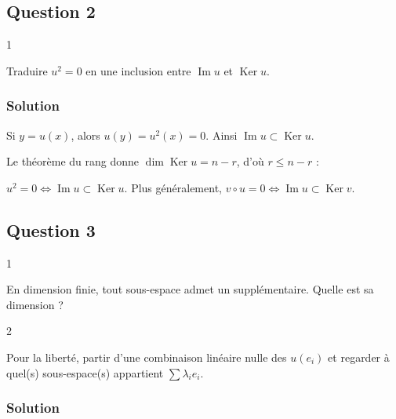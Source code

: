 \documentclass[11pt,a4paper]{article}
\newcommand{\equationajustee}[1]{%
  \sbox{\boiteequation}{$\displaystyle #1$}%
  \ifdim\wd\boiteequation>\linewidth
    \[\resizebox{\linewidth}{!}{\usebox{\boiteequation}}\]%
  \else
    \[#1\]%
  \fi}
\begin{document}
\hypertarget{question-2}{%
\subsection{Question 2}\label{question-2}}

\begin{indication}{1}

Traduire \(u^2=0\) en une inclusion entre \(\operatorname{Im}u\) et \(\operatorname{Ker}u\).

\end{indication}

\hypertarget{solution-1}{%
\subsubsection{Solution}\label{solution-1}}

Si \(y=u(x)\), alors \(u(y)=u^2(x)=0\). Ainsi \(\operatorname{Im}u\subset\operatorname{Ker}u\).

Le théorème du rang donne \(\dim\operatorname{Ker}u=n-r\), d'où \(r\leqslant n-r\) :

\equationajustee{\boxed{r\leqslant\frac n2.}}

\begin{methode}

\(u^2=0\iff\operatorname{Im}u\subset\operatorname{Ker}u\). Plus généralement, \(v\circ u=0\iff\operatorname{Im}u\subset\operatorname{Ker}v\).

\end{methode}

\hypertarget{question-3}{%
\subsection{Question 3}\label{question-3}}

\begin{indication}{1}

En dimension finie, tout sous-espace admet un supplémentaire. Quelle est sa dimension ?

\end{indication}

\begin{indication}{2}

Pour la liberté, partir d'une combinaison linéaire nulle des \(u(e_i)\) et regarder à quel(s) sous-espace(s) appartient \(\sum\lambda_ie_i\).

\end{indication}

\hypertarget{solution-2}{%
\subsubsection{Solution}\label{solution-2}}
\end{document}
